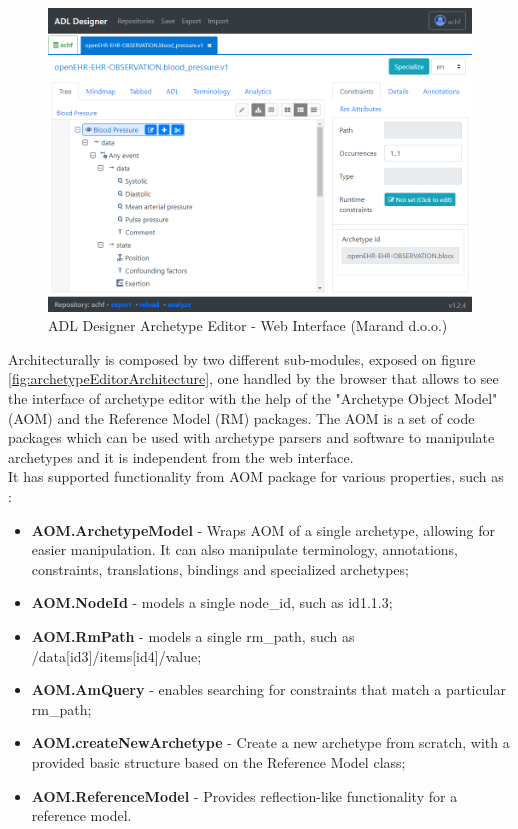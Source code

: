 \documentclass[mim_thesis.tex]{subfiles}
\begin{document}
\begin{figure}[H]
	\centering
    \includegraphics[width=1\textwidth]{img/archetype_editor_adldesigner.PNG}
	\caption{ADL Designer Archetype Editor - Web Interface (Marand d.o.o.)}
	\label{fig:archetypeEditor}
\end{figure}

Architecturally is composed by two different sub-modules, exposed on figure \ref{fig:archetypeEditorArchitecture}, one handled by the browser that allows to see the interface of archetype editor with the help of the "Archetype Object Model" (AOM) and the Reference Model (RM) packages. The AOM is a set of code packages which can be used with archetype parsers and software to manipulate archetypes and it is independent from the web interface. \\

\newpage
It has supported functionality from AOM package for various properties, such as \citep{openEHRALD2016}:
\begin{itemize}[noitemsep]
\item \textbf{AOM.ArchetypeModel} - Wraps AOM of a single archetype, allowing for easier manipulation. It can also manipulate terminology, annotations, constraints, translations, bindings and specialized archetypes;
\item \textbf{AOM.NodeId} - models a single node\_id, such as id1.1.3;
\item \textbf{AOM.RmPath} - models a single rm\_path, such as /data[id3]/items[id4]/value;
\item \textbf{AOM.AmQuery} - enables searching for constraints that match a particular rm\_path;
\item \textbf{AOM.createNewArchetype} - Create a new archetype from scratch, with a provided basic structure based on the Reference Model class;
\item \textbf{AOM.ReferenceModel} - Provides reflection-like functionality for a reference model.
\end{itemize}
\end{document}
